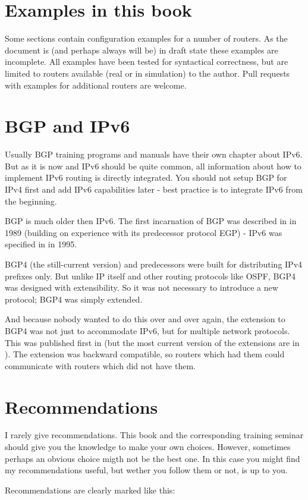 \section{Examples in this book}
Some sections contain configuration examples for a number of routers. As the document is (and perhaps always will be) in draft state these examples are incomplete. All examples have been tested for syntactical correctness, but are limited to routers available (real or in simulation) to the author. Pull requests with examples for additional routers are welcome.

\section{BGP and IPv6}
Usually BGP training programs and manuals have their own chapter about IPv6. But as it is now  and IPv6 should be quite common, all information about how to implement IPv6 routing is directly integrated. You should not setup BGP for IPv4 first and add IPv6 capabilities later - best practice is to integrate IPv6 from the beginning.

BGP is much older then IPv6. The first incarnation of BGP was described in  in 1989 (building on experience with its predecessor protocol \gls{EGP}) - IPv6 was specified in  in 1995.

BGP4 (the still-current version) and predecessors were built for distributing IPv4 prefixes only. But unlike IP itself and other routing protocols like \gls{OSPF}, BGP4 was designed with extensibility. So it was not necessary to introduce a new protocol; BGP4 was simply extended.

And because nobody wanted to do this over and over again, the extension to BGP4 was not just to accommodate IPv6, but for multiple network protocols. This was published first in  (but the most current version of the extensions are in ). The extension was backward compatible, so routers which had them could communicate with routers which did not have them.

\section{Recommendations}
I rarely give recommendations. This book and the corresponding training seminar should give you the knowledge to make your own choices. However, sometimes perhaps an obvious choice migth not be the best one. In this case you might find my recommendations useful, but wether you follow them or not, is up to you.

Recommendations are clearly marked like this:

